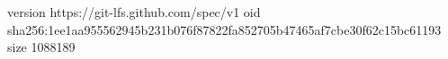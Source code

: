 version https://git-lfs.github.com/spec/v1
oid sha256:1ee1aa955562945b231b076f87822fa852705b47465af7cbe30f62c15bc61193
size 1088189
